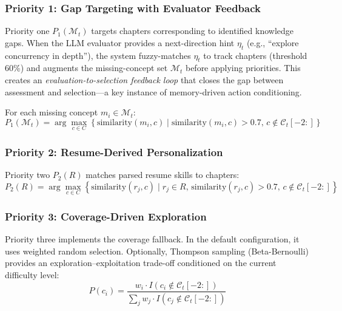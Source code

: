 ﻿\documentclass[final,3p,times,authoryear]{elsarticle}
\begin{document}
\subsubsection{Priority 1: Gap Targeting with Evaluator Feedback}

\noindent Priority one $P_1(\mathcal{M}_t)$ targets chapters corresponding to identified knowledge gaps. When the LLM evaluator provides a next-direction hint $\eta_t$ (e.g., ``explore concurrency in depth''), the system fuzzy-matches $\eta_t$ to track chapters (threshold 60\%) and augments the missing-concept set $\mathcal{M}_t$ before applying priorities. This creates an \emph{evaluation-to-selection feedback loop} that closes the gap between assessment and selection---a key instance of memory-driven action conditioning.

For each missing concept $m_i \in \mathcal{M}_t$:
\begin{equation}
P_1(\mathcal{M}_t) = \arg\max_{c \in C} \left\{ \text{similarity}(m_i, c) \mid \text{similarity}(m_i, c) > 0.7,\, c \notin \mathcal{C}_{t}[-2:] \right\}
\end{equation}

\subsubsection{Priority 2: Resume-Derived Personalization}

\noindent Priority two $P_2(R)$ matches parsed resume skills to chapters:
\begin{equation}
P_2(R) = \arg\max_{c \in C} \left\{ \text{similarity}(r_j, c) \mid r_j \in R,\, \text{similarity}(r_j, c) > 0.7,\, c \notin \mathcal{C}_{t}[-2:] \right\}
\end{equation}

\subsubsection{Priority 3: Coverage-Driven Exploration}

\noindent Priority three implements the coverage fallback. In the default configuration, it uses weighted random selection. Optionally, Thompson sampling (Beta-Bernoulli) provides an exploration--exploitation trade-off conditioned on the current difficulty level:
\begin{equation}
P(c_i) = \frac{w_i \cdot I(c_i \notin \mathcal{C}_t[-2:])}{\sum_{j} w_j \cdot I(c_j \notin \mathcal{C}_t[-2:])}
\end{equation}
\end{document}
